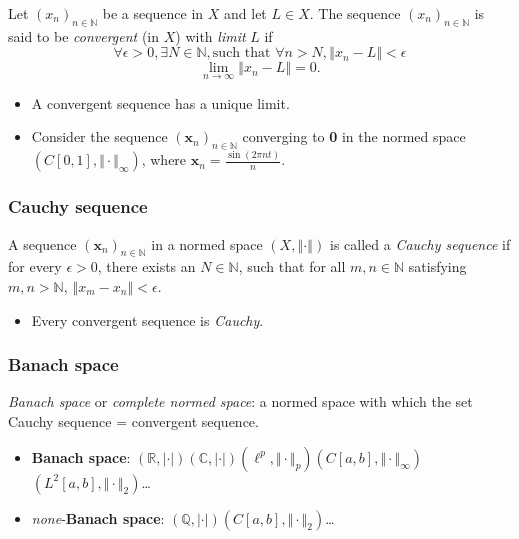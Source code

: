 \documentclass[
	border={25mm 20mm 25mm 30mm},  %
	varwidth,  %
	utf8,
]{standalone}
\begin{document}
Let \(\left(x_n\right)_{n\in\mathbb{N}}\) be a sequence in \(X\) and let \(L\in X\). The sequence \(\left(x_n\right)_{n\in\mathbb{N}}\) is said to be \textit{convergent} (in \(X\)) with \textit{limit} \(L\) if
\[\forall\epsilon>0,\exists N\in\mathbb{N}, \text{such that }\forall n>N, \left\Vert x_n-L\right\Vert<\epsilon\]
\[\lim_{n\to\infty}{\left\Vert x_n-L\right\Vert}=0.\]

\begin{itemize}
	\item A convergent sequence has a unique limit.
	\item Consider the sequence \(\left(\mathbf{x}_n\right)_{n\in\mathbb{N}}\) converging to {\bf{0}} in the normed space \(\left(C[0,1],\Vert\cdot\Vert_\infty\right)\), where \(\displaystyle\mathbf{x}_n=\frac{\sin(2\pi nt)}{n}\).
\end{itemize}

\subsubsection{Cauchy sequence}

A sequence \(\left(\mathbf{x}_n\right)_{n\in\mathbb{N}}\) in a normed space \(\left(X,\left\Vert\cdot\right\Vert\right)\) is called a \textit{Cauchy sequence} if for every \(\epsilon>0\), there exists an \(N\in\mathbb{N}\), such that for all \(m,n\in\mathbb{N}\) satisfying \(m,n>\mathbb{N}\), \(\left\Vert x_m-x_n\right\Vert<\epsilon\).

\begin{itemize}
	\item Every convergent sequence is \textit{Cauchy}.
\end{itemize}

\subsubsection{Banach space}

\textit{Banach space} or \textit{complete normed space}: a normed space with which the set Cauchy sequence = convergent sequence.

\begin{itemize}
	\item {\bf{Banach space}}: \(\left(\mathbb{R},\left|\cdot\right|\right)\)\(\left(\mathbb{C},\left|\cdot\right|\right)\)\(\left(\ell^p,\Vert\cdot\Vert_p\right)\)\(\left(C[a,b],\Vert\cdot\Vert_\infty\right)\)\(\left(L^2[a,b],\Vert\cdot\Vert_2\right)\)\ldots
	\item \textit{none}-{\bf{Banach space}}: \(\left(\mathbb{Q},\left|\cdot\right|\right)\)\(\left(C[a,b],\Vert\cdot\Vert_2\right)\)\ldots
\end{itemize}
\end{document}

